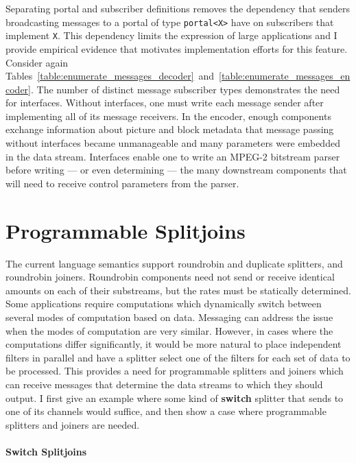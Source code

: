Separating portal and subscriber definitions removes the dependency that senders 
broadcasting messages to a portal of type {\tt portal<X>} have on subscribers 
that implement \texttt{X}. This dependency limits the expression of large applications 
and I provide empirical evidence that motivates implementation efforts for this feature. 
Consider again 
Tables~\ref{table:enumerate_messages_decoder}~and~\ref{table:enumerate_messages_encoder}. 
The number of distinct message subscriber types demonstrates the need for interfaces.
Without interfaces, one must write each message sender after implementing all of its 
message receivers. In the encoder, enough components exchange information about picture 
and block metadata that message passing without interfaces became unmanageable and many 
parameters were embedded in the data stream. Interfaces enable one to write an MPEG-2 
bitstream parser before writing --- or even determining --- the many downstream 
components that will need to receive control parameters from the parser. 

\section{Programmable Splitjoins}
\label{sec:program_splitjoins}

The current language semantics support roundrobin and duplicate splitters, and roundrobin 
joiners. Roundrobin components need not send or receive identical amounts on each of their 
substreams, but the rates must be statically determined. Some applications require 
computations which dynamically switch between several modes of computation based on data. 
Messaging can address the issue when the modes of computation are very similar. However, 
in cases where the computations differ significantly, it would be more natural to place 
independent filters in parallel and have a splitter select one of the filters for each 
set of data to be processed. This provides a need for programmable splitters and joiners 
which can receive messages that determine the data streams to which they should output. 
I first give an example where some kind of \textbf{switch} splitter that sends to one of 
its channels would suffice, and then show a case where programmable splitters and joiners 
are needed.

\paragraph{Switch Splitjoins}

